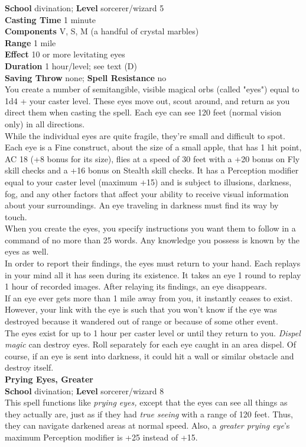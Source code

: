 \textbf{School} divination; \textbf{Level} sorcerer/wizard 5\\
\textbf{Casting Time} 1 minute\\
\textbf{Components} V, S, M (a handful of crystal marbles)\\
\textbf{Range} 1 mile\\
\textbf{Effect} 10 or more levitating eyes\\
\textbf{Duration} 1 hour/level; see text (D)\\
\textbf{Saving Throw} none; \textbf{Spell Resistance} no\\
You create a number of semitangible, visible magical orbs (called "eyes") equal to 1d4 + your caster level. These eyes move out, scout around, and return as you direct them when casting the spell. Each eye can see 120 feet (normal vision only) in all directions.\\
While the individual eyes are quite fragile, they're small and difficult to spot. Each eye is a Fine construct, about the size of a small apple, that has 1 hit point, AC 18 (+8 bonus for its size), flies at a speed of 30 feet with a +20 bonus on Fly skill checks and a +16 bonus on Stealth skill checks. It has a Perception modifier equal to your caster level (maximum +15) and is subject to illusions, darkness, fog, and any other factors that affect your ability to receive visual information about your surroundings. An eye traveling in darkness must find its way by touch.\\
When you create the eyes, you specify instructions you want them to follow in a command of no more than 25 words. Any knowledge you possess is known by the eyes as well.\\
In order to report their findings, the eyes must return to your hand. Each replays in your mind all it has seen during its existence. It takes an eye 1 round to replay 1 hour of recorded images. After relaying its findings, an eye disappears. \\
If an eye ever gets more than 1 mile away from you, it instantly ceases to exist. However, your link with the eye is such that you won't know if the eye was destroyed because it wandered out of range or because of some other event.\\
The eyes exist for up to 1 hour per caster level or until they return to you. \textit{Dispel magic }can destroy eyes. Roll separately for each eye caught in an area dispel. Of course, if an eye is sent into darkness, it could hit a wall or similar obstacle and destroy itself.\\
\textbf{Prying Eyes, Greater}\\
\textbf{School} divination; \textbf{Level} sorcerer/wizard 8\\
This spell functions like \textit{prying eyes, }except that the eyes can see all things as they actually are, just as if they had \textit{true seeing }with a range of 120 feet. Thus, they can navigate darkened areas at normal speed. Also, a \textit{greater prying eye}'s maximum Perception modifier is +25 instead of +15.\\
